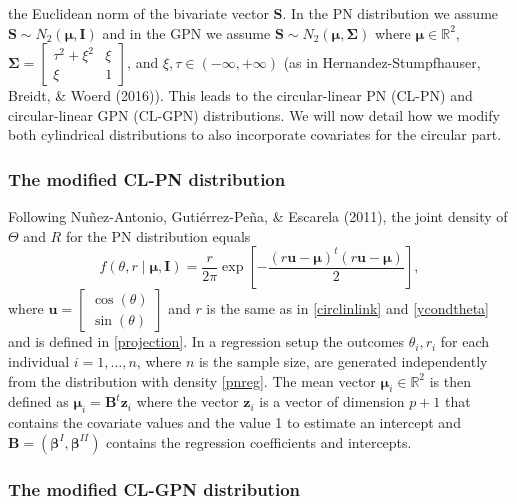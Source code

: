 \documentclass[12pt,]{article}
\begin{document}
the Euclidean norm of the bivariate vector \(\boldsymbol{S}\). In the PN
distribution we assume
\(\boldsymbol{S} \sim N_2(\boldsymbol{\mu}, \boldsymbol{I})\) and in the
GPN we assume
\(\boldsymbol{S} \sim N_2(\boldsymbol{\mu}, \boldsymbol{\Sigma})\) where
\(\boldsymbol{\mu} \in \mathbb{R}^2\),
\(\boldsymbol{\Sigma} = \begin{bmatrix} \tau^2 + \xi^2 & \xi\\ \xi & 1 \end{bmatrix}\),
and \(\xi,\tau \in (-\infty, +\infty)\) (as in Hernandez-Stumpfhauser,
Breidt, \& Woerd (2016)). This leads to the circular-linear PN (CL-PN)
and circular-linear GPN (CL-GPN) distributions. We will now detail how
we modify both cylindrical distributions to also incorporate covariates
for the circular part.

\subsubsection{The modified CL-PN distribution}

Following Nuñez-Antonio, Gutiérrez-Peña, \& Escarela (2011), the joint
density of \(\Theta\) and \(R\) for the PN distribution equals
\begin{equation}\label{pnreg}
f(\theta,r \mid \boldsymbol{\mu}, \boldsymbol{I}) = \frac{r}{2\pi} \exp\left[- \frac{(r\boldsymbol{u} - \boldsymbol{\mu})^t(r\boldsymbol{u} - \boldsymbol{\mu})}{2}\right],
\end{equation} \noindent where
\(\boldsymbol{u}= \begin{bmatrix} \cos (\theta) \\ \sin (\theta) \end{bmatrix}\)
and \(r\) is the same as in \eqref{circlinlink} and \eqref{ycondtheta}
and is defined in \eqref{projection}. In a regression setup the outcomes
\(\theta_i,r_i\) for each individual \(i = 1, \dots, n\), where \(n\) is
the sample size, are generated independently from the distribution with
density \eqref{pnreg}. The mean vector
\(\boldsymbol{\mu}_i \in \mathbb{R}^2\) is then defined as
\(\boldsymbol{\mu}_i = \boldsymbol{B}^t\boldsymbol{z}_i\) where the
vector \(\boldsymbol{z}_i\) is a vector of dimension \(p + 1\) that
contains the covariate values and the value 1 to estimate an intercept
and
\(\boldsymbol{B} = (\boldsymbol{\beta}^{I}, \boldsymbol{\beta}^{II})\)
contains the regression coefficients and intercepts.

\subsubsection{The modified CL-GPN distribution}
\end{document}
